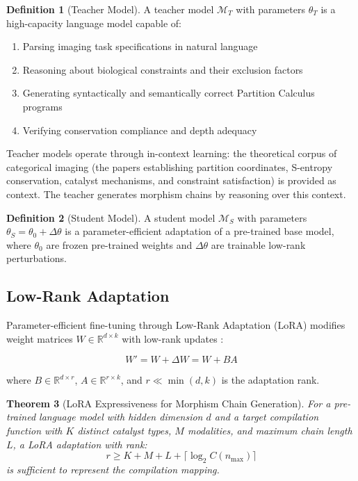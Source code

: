 \documentclass[11pt,a4paper]{article}
\newtheorem{theorem}{Theorem}[section]
\theoremstyle{definition}
\newtheorem{definition}[theorem]{Definition}
\theoremstyle{remark}
\newcommand{\R}{\mathbb{R}}
\newcommand{\model}{\mathcal{M}}
\newcommand{\params}{\theta}
\begin{document}
\begin{definition}[Teacher Model]
\label{def:teacher}
A teacher model $\model_T$ with parameters $\params_T$ is a high-capacity language model capable of:
\begin{enumerate}
    \item Parsing imaging task specifications in natural language
    \item Reasoning about biological constraints and their exclusion factors
    \item Generating syntactically and semantically correct Partition Calculus programs
    \item Verifying conservation compliance and depth adequacy
\end{enumerate}
\end{definition}

Teacher models operate through in-context learning: the theoretical corpus of categorical imaging (the papers establishing partition coordinates, S-entropy conservation, catalyst mechanisms, and constraint satisfaction) is provided as context. The teacher generates morphism chains by reasoning over this context.

\begin{definition}[Student Model]
\label{def:student}
A student model $\model_S$ with parameters $\params_S = \params_0 + \Delta\params$ is a parameter-efficient adaptation of a pre-trained base model, where $\params_0$ are frozen pre-trained weights and $\Delta\params$ are trainable low-rank perturbations.
\end{definition}

\subsection{Low-Rank Adaptation}

Parameter-efficient fine-tuning through Low-Rank Adaptation (LoRA) modifies weight matrices $W \in \R^{d \times k}$ with low-rank updates \cite{Hu2022}:

\begin{equation}
W' = W + \Delta W = W + BA
\end{equation}

where $B \in \R^{d \times r}$, $A \in \R^{r \times k}$, and $r \ll \min(d, k)$ is the adaptation rank.

\begin{theorem}[LoRA Expressiveness for Morphism Chain Generation]
\label{thm:lora}
For a pre-trained language model with hidden dimension $d$ and a target compilation function with $K$ distinct catalyst types, $M$ modalities, and maximum chain length $L$, a LoRA adaptation with rank:
\begin{equation}
r \geq K + M + L + \lceil \log_2 C(n_{\max}) \rceil
\end{equation}
is sufficient to represent the compilation mapping.
\end{theorem}
\end{document}

